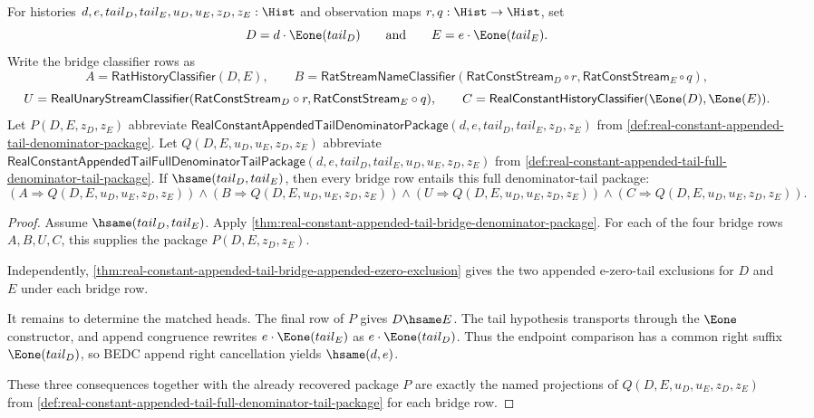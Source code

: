 \begin{theorem}
\label{thm:real-constant-appended-tail-bridge-full-denominator-tail-package}
For histories $d,e,tail_D,tail_E,u_D,u_E,z_D,z_E:\Hist$ and observation maps
$r,q:\Hist\to\Hist$, set
$$
D=d\cdot\Eone(tail_D)
\qquad\text{and}\qquad
E=e\cdot\Eone(tail_E).
$$
Write the bridge classifier rows as
$$
A=\mathsf{RatHistoryClassifier}(D,E),
\qquad
B=\mathsf{RatStreamNameClassifier}(\mathsf{RatConstStream}_D\circ r,
\mathsf{RatConstStream}_E\circ q),
$$
$$
U=\mathsf{RealUnaryStreamClassifier}(\mathsf{RatConstStream}_D\circ r,
\mathsf{RatConstStream}_E\circ q),
\qquad
C=\mathsf{RealConstantHistoryClassifier}(\Eone(D),\Eone(E)).
$$
Let $P(D,E,z_D,z_E)$ abbreviate
$\mathsf{RealConstantAppendedTailDenominatorPackage}
(d,e,tail_D,tail_E,z_D,z_E)$ from
\autoref{def:real-constant-appended-tail-denominator-package}. Let
$Q(D,E,u_D,u_E,z_D,z_E)$ abbreviate
$\mathsf{RealConstantAppendedTailFullDenominatorTailPackage}
(d,e,tail_D,tail_E,u_D,u_E,z_D,z_E)$ from
\autoref{def:real-constant-appended-tail-full-denominator-tail-package}.
If $\hsame(tail_D,tail_E)$, then every bridge row entails this full
denominator-tail package:
$$
(A\Longrightarrow Q(D,E,u_D,u_E,z_D,z_E))\land
(B\Longrightarrow Q(D,E,u_D,u_E,z_D,z_E))\land
(U\Longrightarrow Q(D,E,u_D,u_E,z_D,z_E))\land
(C\Longrightarrow Q(D,E,u_D,u_E,z_D,z_E)).
$$
\end{theorem}
\begin{proof}
Assume $\hsame(tail_D,tail_E)$. Apply
\autoref{thm:real-constant-appended-tail-bridge-denominator-package}. For each
of the four bridge rows $A,B,U,C$, this supplies the package
$P(D,E,z_D,z_E)$.

Independently,
\autoref{thm:real-constant-appended-tail-bridge-appended-ezero-exclusion}
gives the two appended e-zero-tail exclusions for $D$ and $E$ under each bridge
row.

It remains to determine the matched heads. The final row of $P$ gives
$D\hsame E$. The tail hypothesis transports through the $\Eone$ constructor,
and append congruence rewrites $e\cdot\Eone(tail_E)$ as
$e\cdot\Eone(tail_D)$. Thus the endpoint comparison has a common right suffix
$\Eone(tail_D)$, so BEDC append right cancellation yields $\hsame(d,e)$.

These three consequences together with the already recovered package $P$ are
exactly the named projections of $Q(D,E,u_D,u_E,z_D,z_E)$ from
\autoref{def:real-constant-appended-tail-full-denominator-tail-package} for
each bridge row.
\end{proof}

